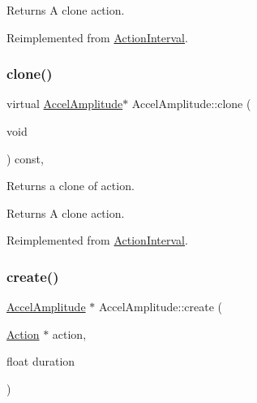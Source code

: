 \begin{DoxyReturn}{Returns}
A clone action. 
\end{DoxyReturn}


Reimplemented from \hyperlink{classActionInterval_abc93ce0c2f54a90eb216a7803f25f44a}{Action\+Interval}.

\mbox{\label{classAccelAmplitude_aea1295dd7e3961b2209d03915b323e1a}} 
\subsubsection{\texorpdfstring{clone()}{clone()}\hspace{0.1cm}{\footnotesize\ttfamily [2/2]}}
{\footnotesize\ttfamily virtual \hyperlink{classAccelAmplitude}{Accel\+Amplitude}$\ast$ Accel\+Amplitude\+::clone (\begin{DoxyParamCaption}\item[{void}]{ }\end{DoxyParamCaption}) const\hspace{0.3cm}{\ttfamily [override]}, {\ttfamily [virtual]}}

Returns a clone of action.

\begin{DoxyReturn}{Returns}
A clone action. 
\end{DoxyReturn}


Reimplemented from \hyperlink{classActionInterval_abc93ce0c2f54a90eb216a7803f25f44a}{Action\+Interval}.

\mbox{\label{classAccelAmplitude_a39dfe3b4b2ae24a4a64cda6be35ed217}} 
\subsubsection{\texorpdfstring{create()}{create()}\hspace{0.1cm}{\footnotesize\ttfamily [1/2]}}
{\footnotesize\ttfamily \hyperlink{classAccelAmplitude}{Accel\+Amplitude} $\ast$ Accel\+Amplitude\+::create (\begin{DoxyParamCaption}\item[{\hyperlink{classAction}{Action} $\ast$}]{action,  }\item[{float}]{duration }\end{DoxyParamCaption})\hspace{0.3cm}{\ttfamily [static]}}



